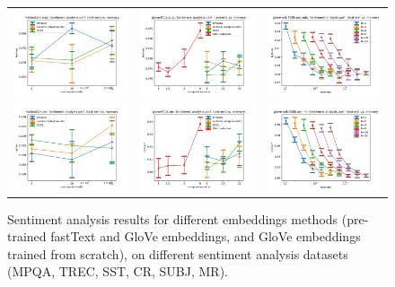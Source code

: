 \begin{figure}
\begin{tabular} {c c c}
	\includegraphics[width=0.28\linewidth]{figures/fasttext1m_subj_test-err_vs_compression.pdf} &
	\includegraphics[width=0.28\linewidth]{figures/glove400k_subj_test-err_vs_compression.pdf} &
	\includegraphics[width=0.28\linewidth]{figures/glove-wiki400k-am_subj_test-err_vs_compression.pdf} \\[-0.5em]
	\includegraphics[width=0.28\linewidth]{figures/fasttext1m_mr_test-err_vs_compression.pdf} &
	\includegraphics[width=0.28\linewidth]{figures/glove400k_mr_test-err_vs_compression.pdf} &
	\includegraphics[width=0.28\linewidth]{figures/glove-wiki400k-am_mr_test-err_vs_compression.pdf} \\[-0.5em]
	\end{tabular}
	\caption{
		Sentiment analysis results for different embeddings methods (pre-trained fastText and GloVe embeddings, and GloVe embeddings trained from scratch), on different sentiment analysis datasets (MPQA, TREC, SST, CR, SUBJ, MR).
	}
	\label{fig:all_sentiment}
\end{figure}


